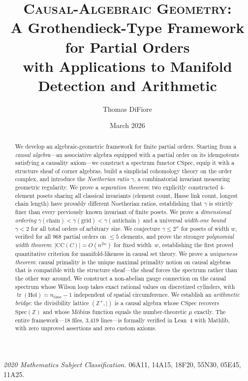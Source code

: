 \documentclass[11pt,a4paper]{article}
\title{\textsc{Causal-Algebraic Geometry}:\\[6pt]
A Grothendieck-Type Framework for Partial Orders\\[4pt]
{\large with Applications to Manifold Detection and Arithmetic}}
\author{Thomas DiFiore}
\date{March 2026}
\theoremstyle{plain}
\theoremstyle{definition}
\theoremstyle{remark}
\newcommand{\CSpec}{\mathrm{CSpec}}
\newcommand{\CC}{\mathrm{CC}}
\newcommand{\Spec}{\mathrm{Spec}}
\newcommand{\Hol}{\mathrm{Hol}}
\newcommand{\Z}{\mathbb{Z}}
\begin{document}
\maketitle

\begin{abstract}
We develop an algebraic-geometric framework for finite partial orders.
Starting from a \emph{causal algebra}---an associative algebra equipped with a partial order on its idempotents satisfying a causality axiom---we construct a spectrum functor $\CSpec$, equip it with a structure sheaf of corner algebras, build a simplicial cohomology theory on the order complex, and introduce the \emph{Noetherian ratio} $\gamma$, a combinatorial invariant measuring geometric regularity.
We prove a \emph{separation theorem}: two explicitly constructed 4-element posets sharing all classical invariants (element count, Hasse link count, longest chain length) have provably different Noetherian ratios, establishing that $\gamma$ is strictly finer than every previously known invariant of finite posets.
We prove a \emph{dimensional ordering} $\gamma(\text{chain}) < \gamma(\text{grid}) < \gamma(\text{antichain})$ and a universal \emph{width-one bound} $\gamma < 2$ for all total orders of arbitrary size.
We conjecture $\gamma \leq 2^w$ for posets of width $w$, verified for all 968 partial orders on $\leq 5$ elements, and prove the stronger \emph{polynomial width theorem}: $|\CC(C)| = O(n^{2w})$ for fixed width~$w$, establishing the first proved quantitative criterion for manifold-likeness in causal set theory.
We prove a \emph{uniqueness theorem}: causal primality is the unique maximal primality notion on causal algebras that is compatible with the structure sheaf---the sheaf forces the spectrum rather than the other way around.
We construct a non-abelian gauge connection on the causal spectrum whose Wilson loop takes exact rational values on discretized cylinders, with $\operatorname{tr}(\Hol) = n_{\mathrm{time}} - 1$ independent of spatial circumference.
We establish an \emph{arithmetic bridge}: the divisibility lattice $(\Z^+, \mid)$ is a causal algebra whose $\CSpec$ recovers $\Spec(\Z)$ and whose M\"obius function equals the number-theoretic $\mu$ exactly.
The entire framework---18 files, 3{,}419 lines---is formally verified in Lean~4 with Mathlib, with zero unproved assertions and zero custom axioms.
\end{abstract}

\medskip

\noindent\textit{2020 Mathematics Subject Classification.}
06A11, 14A15, 18F20, 55N30, 05E45, 11A25.
\end{document}
